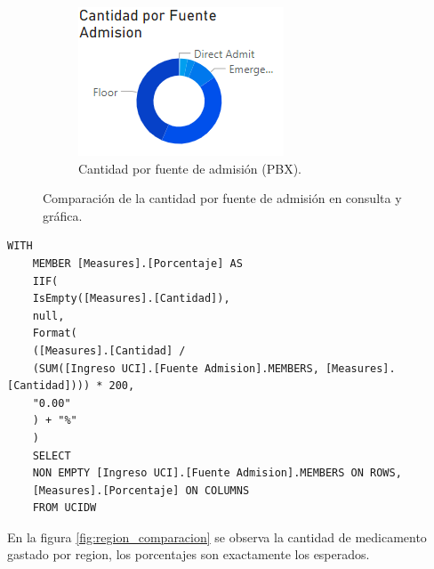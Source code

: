 \documentclass{article}
\begin{document}
\begin{figure}[H]
\begin{subfigure}[b]{0.4\textwidth}
		\includegraphics[width=\textwidth]{images/cantidad_fuente_admision_pbx.png}
		\caption{Cantidad por fuente de admisión (PBX).}
		\label{fig:fuente_admision_pbx}
	\end{subfigure}
	\caption{Comparación de la cantidad por fuente de admisión en consulta y gráfica.}
	\label{fig:fuente_admision_comparacion}
\end{figure}

\begin{lstlisting}[style=ddlstyle, label=lst:consulta1, caption=Cantidad por fuente de admisión]
	WITH 
	MEMBER [Measures].[Porcentaje] AS
	IIF(
	IsEmpty([Measures].[Cantidad]),
	null,
	Format(
	([Measures].[Cantidad] / 
	(SUM([Ingreso UCI].[Fuente Admision].MEMBERS, [Measures].[Cantidad]))) * 200, 
	"0.00"
	) + "%"
	)
	SELECT 
	NON EMPTY [Ingreso UCI].[Fuente Admision].MEMBERS ON ROWS,
	[Measures].[Porcentaje] ON COLUMNS
	FROM UCIDW
\end{lstlisting}

En la figura \ref{fig:region_comparacion} se observa la cantidad de medicamento gastado por region, los porcentajes son exactamente los esperados.
\end{document}
